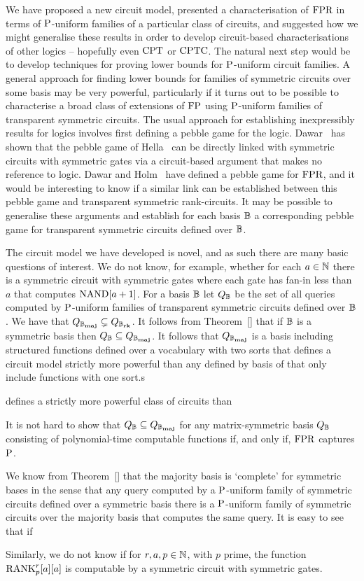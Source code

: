 \documentclass[../paper.tex]{subfiles}
\begin{document}
We have proposed a new circuit model, presented a characterisation of $\text{\upshape FPR}$ in
terms of $\mathrm{P}$-uniform families of a particular class of circuits, and suggested
how we might generalise these results in order to develop circuit-based
characterisations of other logics -- hopefully even $\text{\upshape CPT}$ or $\text{\upshape CPTC}$. The
natural next step would be to develop techniques for proving lower bounds for
$\mathrm{P}$-uniform circuit families. A general approach for finding lower bounds for
families of symmetric circuits over some basis may be very powerful,
particularly if it turns out to be possible to characterise a broad class of
extensions of $\text{\upshape FP}$ using $\mathrm{P}$-uniform families of transparent symmetric
circuits. The usual approach for establishing inexpressibly results for logics
involves first defining a pebble game for the logic. Dawar~\cite{} has shown
that the pebble game of Hella~\cite{} can be directly linked with symmetric
circuits with symmetric gates via a circuit-based argument that makes no
reference to logic. Dawar and Holm~\cite{} have defined a pebble game for
$\text{\upshape FPR}$, and it would be interesting to know if a similar link can be established
between this pebble game and transparent symmetric rank-circuits. It may be
possible to generalise these arguments and establish for each basis $\mathbb{B}$ a
corresponding pebble game for transparent symmetric circuits defined over $\mathbb{B}$.

The circuit model we have developed is novel, and as such there are many basic
questions of interest. We do not know, for example, whether for each $a \in
\mathbb{N}$ there is a symmetric circuit with symmetric gates where each gate has
fan-in less than $a$ that computes $\text{\upshape NAND}[a+1]$. For a basis $\mathbb{B}$ let $Q_{\mathbb{B}}$
be the set of all queries computed by $\mathrm{P}$-uniform families of transparent
symmetric circuits defined over $\mathbb{B}$. We have that $Q_{\mathbb{B}_{\text{\textbf{maj}}}} \subsetneq
Q_{\mathbb{B}_{\text{\textbf{rk}}}}$. It follows from Theorem~\ref{} that if $\mathbb{B}$ is a symmetric basis then
$Q_{\mathbb{B}} \subseteq Q_{\mathbb{B}_{\text{\textbf{maj}}}}$. It follows that $Q_{\mathbb{B}_{\text{\textbf{maj}}}}$ is a basis including structured
functions defined over a vocabulary with two sorts that defines a circuit model
strictly more powerful than any defined by basis of that only include functions
with one sort.s


defines a strictly more powerful class of circuits than

It is not hard to show that $Q_{\mathbb{B}} \subseteq Q_{\mathbb{B}_{\text{\textbf{maj}}}}$ for any matrix-symmetric
basis $Q_{\mathbb{B}}$ consisting of polynomial-time computable functions if, and only
if, $\text{\upshape FPR}$ captures $\mathrm{P}$.


We know from Theorem~\ref{} that the majority basis is `complete' for symmetric
bases in the sense that any query computed by a $\mathrm{P}$-uniform family of
symmetric circuits defined over a symmetric basis there is a $\mathrm{P}$-uniform
family of symmetric circuits over the majority basis that computes the same
query. It is easy to see that if


Similarly, we do not know if for $r, a, p \in \mathbb{N}$, with $p$ prime, the
function $\text{\upshape RANK}^r_p [a][a]$ is computable by a symmetric circuit with symmetric
gates.
\end{document}
